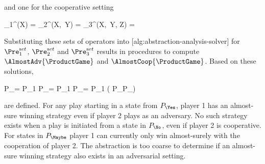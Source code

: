     and one for the cooperative setting

    \startformula
        \startalign[n=2,align={right,left}]
            \NC \Pre_1^{\Cooperative}(X) =
            \NC {} \EndComma
            \NR
            \NC \Pre_2^{\Cooperative}(X,\, Y) =
            \NC {} \EndComma
            \NR
            \NC \Pre_3^{\Cooperative}(X,\, Y, Z) =
            \NC {} \EndPeriod
            \NR
        \stopalign
    \stopformula


    Substituting these sets of operators into [alg:abstraction-analysis-solver] for $\Pre_1^{\mathrm set}$, $\Pre_2^{\mathrm set}$ and $\Pre_3^{\mathrm set}$ results in procedures to compute $\AlmostAdv{\ProductGame}$ and $\AlmostCoop{\ProductGame}$.
    Based on these solutions,

    \startformula
        \startalign[n=2,align={right,left}]
            \NC P_\Yes =
            \NC P_1 \cap \AlmostAdv{\ProductGame} \EndComma
            \NR
            \NC P_\No =
            \NC P_1 \setminus \AlmostCoop{\ProductGame} \EndAnd
            \NR
            \NC P_\Maybe =
            \NC P_1 \setminus ( P_\Yes \cup P_\No )
            \NR
        \stopalign
    \stopformula

    are defined.
    For any play starting in a state from $P_\Yes$, player 1 has an almost-sure winning strategy even if player 2 plays as an adversary.
    No such strategy exists when a play is initiated from a state in $P_\No$, even if player 2 is cooperative.
    For states in $P_\Maybe$ player 1 can currently only win almost-surely with the cooperation of player 2.
    The abstraction is too coarse to determine if an almost-sure winning strategy also exists in an adversarial setting.


